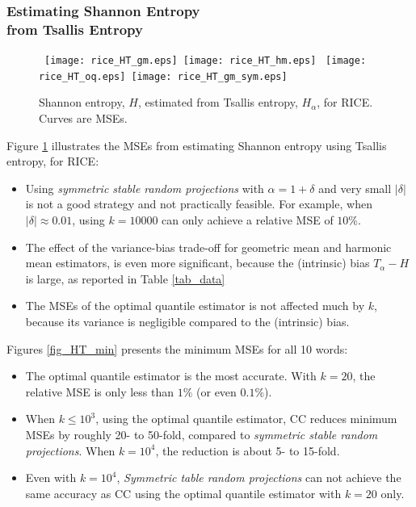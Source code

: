 \documentclass{sig-alternate}
\begin{document}
\subsubsection{Estimating Shannon Entropy\\ from Tsallis Entropy}

\begin{figure}[h]
\begin{center}\mbox{
{\texttt{[image: rice\_HT\_gm.eps]}} \hspace{-0.1in}
{\texttt{[image: rice\_HT\_hm.eps]}}}
\mbox{
{\texttt{[image: rice\_HT\_oq.eps]}} \hspace{-0.1in}
{\texttt{[image: rice\_HT\_gm\_sym.eps]}}
}
\end{center}
\vspace{-0.15in}
\caption{ Shannon entropy, $H$, estimated from Tsallis entropy, $H_{\alpha}$, for RICE. Curves are MSEs.}\label{fig_rice_HT}
\end{figure}


Figure \ref{fig_rice_HT} illustrates the MSEs from estimating Shannon entropy using Tsallis entropy, for RICE:
\begin{itemize}
\item Using {\em symmetric stable random projections} with $\alpha=1+\delta$ and very small $|\delta|$ is not a good strategy and not practically feasible. For example, when $|\delta|\approx 0.01$, using $k = 10000$ can only achieve a relative MSE of $10\%$.
\item The effect of the variance-bias trade-off for geometric mean and harmonic mean estimators, is even more significant, because the (intrinsic) bias $T_\alpha - H$ is large, as reported in Table \ref{tab_data}
\item The MSEs of the optimal quantile estimator is not affected much by $k$, because its variance is negligible compared to the (intrinsic) bias.
\end{itemize}


Figures \ref{fig_HT_min} presents the minimum MSEs for all 10 words:
\begin{itemize}
\item The optimal quantile estimator is the most accurate.  With $k = 20$, the relative MSE is only less than $1\%$ (or even $0.1\%$).
\item When $k\leq 10^3$, using the optimal quantile estimator, CC reduces  minimum MSEs by roughly 20-  to 50-fold, compared to {\em symmetric stable random projections}. When $k = 10^4$, the reduction is about 5- to 15-fold.
\item Even with $k=10^4$, {\em Symmetric table random projections} can not achieve the same accuracy as CC using the optimal quantile estimator with $k = 20$ only.
\end{itemize}
\end{document}
